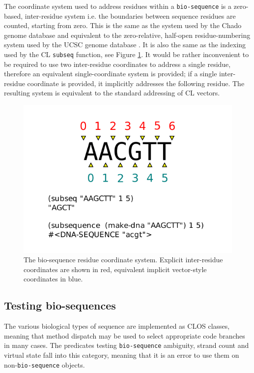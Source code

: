 \documentclass[a4paper, 12pt]{article}
\begin{document}
The coordinate system used to address residues within a
\lstinline!bio-sequence! is a zero-based, inter-residue system
i.e. the boundaries between sequence residues are counted, starting
from zero. This is the same as the system used by the Chado genome
database \cite{gmod-chado} and equivalent to the zero-relative,
half-open residue-numbering system used by the UCSC genome database
\cite{PMID:18996895}. It is also the same as the indexing used by the
CL \lstinline!subseq! function, see Figure
\ref{fig:inter-residue-coords}. It would be rather inconvenient
to be required to use two inter-residue coordinates to address a
single residue, therefore an equivalent single-coordinate system is
provided; if a single inter-residue coordinate is provided, it
implicitly addresses the following residue. The resulting system is
equivalent to the standard addressing of CL vectors.

\begin{figure}[hb]
  \begin{center}
    \includegraphics[scale=1.0]{inter-residue-coordinates.pdf}
  \end{center}
  \caption{The bio-sequence residue coordinate system. Explicit
    inter-residue coordinates are shown in red, equivalent implicit
    vector-style coordinates in blue.}
  \label{fig:inter-residue-coords}
\end{figure}

\subsection{Testing bio-sequences}

The various biological types of sequence are implemented as CLOS
classes, meaning that method dispatch may be used to select
appropriate code branches in many cases. The predicates testing
\lstinline!bio-sequence! ambiguity, strand count and virtual state
fall into this category, meaning that it is an error to use them on
non-\lstinline!bio-sequence! objects.
\end{document}
